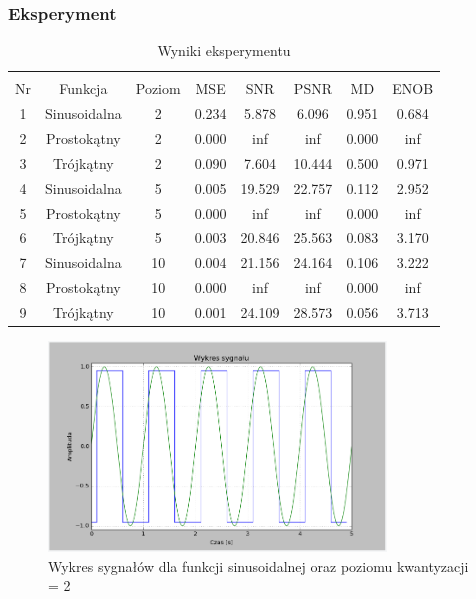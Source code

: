 \documentclass{article}
\begin{document}
    \subsubsection{Eksperyment}

    \begin{table}[h!]
        \centering
        \vspace{0.2cm}
        \begin{tabular}{|c|c|c|c|c|c|c|c|}
            \hline\hline\\[-0.4cm]
            Nr & Funkcja & Poziom & MSE & SNR & PSNR & MD & ENOB  \\
            \hline
            1 & Sinusoidalna & 2 & 0.234 & 5.878 & 6.096 & 0.951 & 0.684 \\
            \hline
            2 & Prostokątny & 2 & 0.000 & inf & inf & 0.000 & inf  \\
            \hline
            3 & Trójkątny & 2 & 0.090 & 7.604 & 10.444 & 0.500 & 0.971   \\
            \hline
            4 & Sinusoidalna & 5 & 0.005 & 19.529 & 22.757 & 0.112 & 2.952  \\
            \hline
            5 & Prostokątny & 5 & 0.000 & inf & inf & 0.000 & inf   \\
            \hline
            6 & Trójkątny & 5 & 0.003 & 20.846 & 25.563 & 0.083 & 3.170   \\
            \hline
            7 & Sinusoidalna & 10 & 0.004 & 21.156 & 24.164 & 0.106 & 3.222    \\
            \hline
            8 & Prostokątny & 10 & 0.000 & inf & inf & 0.000 & inf   \\
            \hline
            9 & Trójkątny & 10 & 0.001 & 24.109 & 28.573 & 0.056 & 3.713   \\
            \hline
        \end{tabular}
        \caption{Wyniki eksperymentu}
    \end{table}
    \FloatBarrier

    \begin{figure}[h!]
        \centering
        \includegraphics[width=0.8\textwidth]{img/1/quad_sin_2.png}
        \caption{Wykres sygnałów dla funkcji sinusoidalnej oraz poziomu kwantyzacji = 2}
    \end{figure}
    \FloatBarrier
\end{document}
